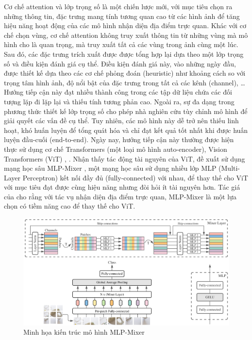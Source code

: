 Cơ chế attention và lớp trọng số là một chiến lược mới, với mục tiêu chọn ra những thông tin, đặc trưng mang tính tương quan cao từ các hình ảnh để tăng hiệu năng hoạt động của các mô hình nhận diện địa điểm trực quan. Khác với cơ chế chọn vùng, cơ chế attention không truy xuất thông tin từ những vùng mà mô hình cho là quan trọng, mà truy xuất tất cả các vùng trong ảnh cùng một lúc. Sau đó, các đặc trưng trích xuất được được tổng hợp lại dựa theo một lớp trọng số và điều kiện đánh giá cụ thể. Điều kiện đánh giá này, vào những ngày đầu, được thiết kế dựa theo các cơ chế phỏng đoán (heuristic) như khoảng cách so với trọng tâm hình ảnh, độ nổi bật của đặc trưng trong tất cả các kênh (channel), \dots Hướng tiếp cận này đạt nhiều thành công trong các tập dữ liệu chứa các đối tượng lặp đi lặp lại và thiếu tính tương phản cao. Ngoài ra, sự đa dạng trong phương thức thiết kế lớp trọng số cho phép nhà nghiên cứu tùy chỉnh mô hình để giải quyết các vấn đề cụ thể. Tuy nhiên, các mô hình này dễ trở nên thiếu linh hoạt, khó huấn luyện để tổng quát hóa và chỉ đạt kết quả tốt nhất khi được huấn luyện đầu-cuối (end-to-end). Ngày nay, hướng tiếp cận này thường được hiện thực sử dụng cơ chế Transformers (một loại mô hình auto-encoder), Vision Transformers (ViT) \cite{dosovitskiy2020image}, \cite{shavit2023coarse}. Nhận thấy tác động tài nguyên của ViT, \cite{alibey2023mixvpr} đề xuất sử dụng mạng học sâu MLP-Mixer \cite{tolstikhin2021mlpmixer}, một mạng học sâu sử dụng nhiều lớp MLP (Multi-Layer Perceptron) kết nối đầy đủ (fully-connected) với nhau, để thay thế cho ViT với mục tiêu đạt được cùng hiệu năng nhưng đòi hỏi ít tài nguyên hơn. Tác giá của \cite{alibey2023mixvpr} cho rằng với tác vụ nhận diện địa điểm trực quan, MLP-Mixer là một lựa chọn có tiềm năng cao để thay thế cho ViT.

\begin{figure}[H]
    \centering
    \includegraphics[width=\textwidth]{pics/Chapter2/mlpmixer.png}
    \caption{Minh họa kiến trúc mô hình MLP-Mixer \cite{tolstikhin2021mlpmixer}}
\end{figure}

